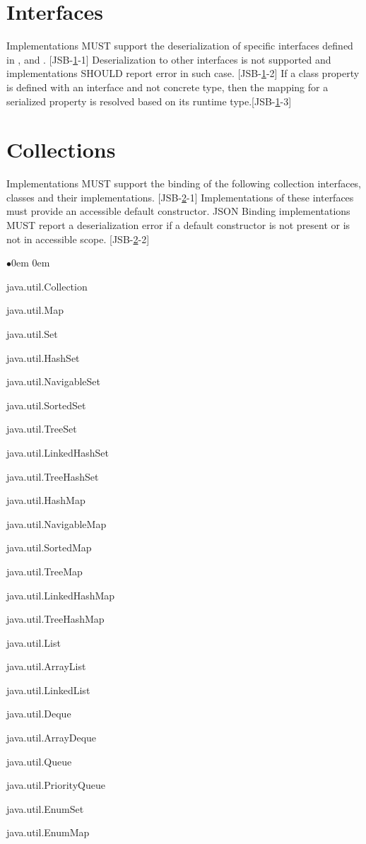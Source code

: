 \section{Interfaces}
\label{sec:interfaces}
Implementations MUST support the deserialization of specific interfaces defined in  , and . [JSB-\ref{sec:interfaces}-1] 
Deserialization to other interfaces is not supported and implementations SHOULD report error in such case. [JSB-\ref{sec:interfaces}-2] 
If a class property is defined with an interface and not concrete type, then the mapping for a serialized property is resolved based on its runtime type.[JSB-\ref{sec:interfaces}-3]

\section{Collections}
\label{sec:collections}
Implementations MUST support the binding of the following collection interfaces, classes and their implementations. [JSB-\ref{sec:collections}-1] 
Implementations of these interfaces must provide an accessible default constructor. JSON Binding implementations MUST report a deserialization error if a default constructor is not present or is not in accessible scope. [JSB-\ref{sec:collections}-2]

\begin{list}{$\bullet$}{\parsep 0em  0em}
\item java.util.Collection
\item java.util.Map
\item java.util.Set
\item java.util.HashSet
\item java.util.NavigableSet
\item java.util.SortedSet
\item java.util.TreeSet
\item java.util.LinkedHashSet
\item java.util.TreeHashSet
\item java.util.HashMap
\item java.util.NavigableMap
\item java.util.SortedMap
\item java.util.TreeMap
\item java.util.LinkedHashMap
\item java.util.TreeHashMap
\item java.util.List
\item java.util.ArrayList
\item java.util.LinkedList
\item java.util.Deque
\item java.util.ArrayDeque
\item java.util.Queue
\item java.util.PriorityQueue
\item java.util.EnumSet
\item java.util.EnumMap
\end{list}

